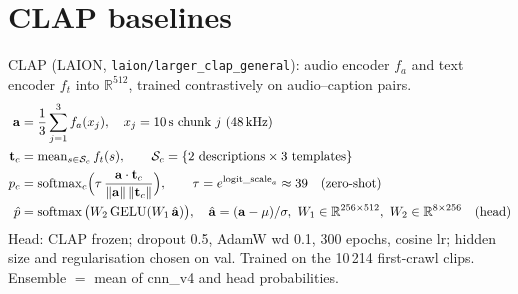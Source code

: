 \documentclass[11pt]{article}
\begin{document}
\section{CLAP baselines}
CLAP (LAION, \texttt{laion/larger\_clap\_general}): audio encoder $f_a$ and text encoder $f_t$ into $\mathbb{R}^{512}$, trained contrastively on audio--caption pairs.
\begin{align}
\mathbf{a} &= \frac{1}{3}\sum_{j=1}^{3} f_a(x_j),\quad x_j = \text{10\,s chunk } j\ \text{(48\,kHz)} \\
\mathbf{t}_c &= \operatorname{mean}_{s\in\mathcal{S}_c} f_t(s),\qquad \mathcal{S}_c = \{\text{2 descriptions} \times \text{3 templates}\} \\
p_c &= \operatorname{softmax}_c\!\Big(\tau \,\frac{\mathbf{a}\cdot\mathbf{t}_c}{\|\mathbf{a}\|\,\|\mathbf{t}_c\|}\Big),\qquad \tau = e^{\text{logit\_scale}_a}\approx 39 \quad\text{(zero-shot)} \\
\hat p &= \operatorname{softmax}\big(W_2\,\mathrm{GELU}(W_1\,\hat{\mathbf{a}})\big),\quad \hat{\mathbf{a}}=(\mathbf{a}-\mu)/\sigma,\ W_1\in\mathbb{R}^{256\times512},\ W_2\in\mathbb{R}^{8\times256} \quad\text{(head)}
\end{align}
Head: CLAP frozen; dropout 0.5, AdamW wd 0.1, 300 epochs, cosine lr; hidden size and regularisation chosen on val. Trained on the 10\,214 first-crawl clips. Ensemble $=$ mean of cnn\_v4 and head probabilities.
\end{document}
